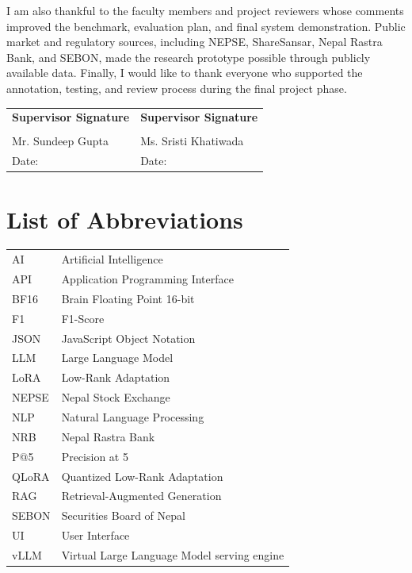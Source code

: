 \documentclass[12pt,a4paper]{report}
\newcommand{\supervisorone}{Mr. Sundeep Gupta}
\newcommand{\supervisortwo}{Ms. Sristi Khatiwada}
\begin{document}
I am also thankful to the faculty members and project reviewers whose comments improved the benchmark, evaluation plan, and final system demonstration. Public market and regulatory sources, including NEPSE, ShareSansar, Nepal Rastra Bank, and SEBON, made the research prototype possible through publicly available data. Finally, I would like to thank everyone who supported the annotation, testing, and review process during the final project phase.

\vspace{1.4cm}
\begin{tabularx}{\textwidth}{@{}X X@{}}
\textbf{Supervisor Signature} & \textbf{Supervisor Signature} \\[1.2cm]
\hrulefill & \hrulefill \\
\supervisorone{} & \supervisortwo{} \\
Date: \hrulefill & Date: \hrulefill \\
\end{tabularx}

\tableofcontents
\clearpage

\listoffigures
{}
\clearpage

\listoftables
{}
\clearpage

\chapter*{List of Abbreviations}
\begin{tabular}{ll}
AI & Artificial Intelligence \\
API & Application Programming Interface \\
BF16 & Brain Floating Point 16-bit \\
F1 & F1-Score \\
JSON & JavaScript Object Notation \\
LLM & Large Language Model \\
LoRA & Low-Rank Adaptation \\
NEPSE & Nepal Stock Exchange \\
NLP & Natural Language Processing \\
NRB & Nepal Rastra Bank \\
P@5 & Precision at 5 \\
QLoRA & Quantized Low-Rank Adaptation \\
RAG & Retrieval-Augmented Generation \\
SEBON & Securities Board of Nepal \\
UI & User Interface \\
vLLM & Virtual Large Language Model serving engine \\
\end{tabular}
\clearpage
\end{document}
